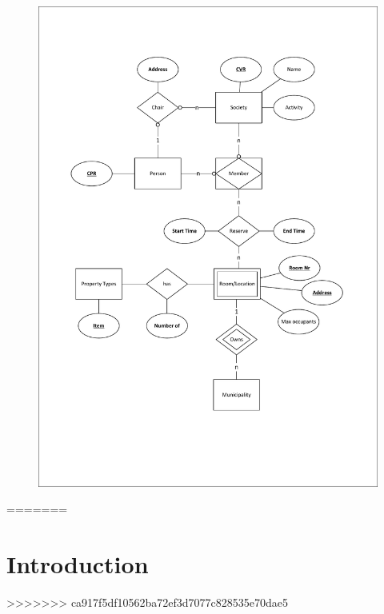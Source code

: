 \begin{figure}[h]
  \centering
  \includegraphics[]{./ER diagram 1.pdf}
\end{figure}
=======
\section{Introduction}


\newpage
>>>>>>> ca917f5df10562ba72ef3d7077c828535e70dae5
